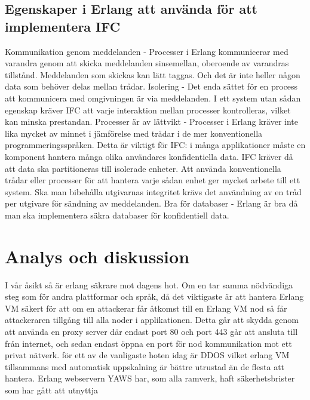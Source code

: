 \documentclass[12pt]{article}
\begin{document}
\subsection*{Egenskaper i Erlang att använda för att implementera IFC} 
Kommunikation genom meddelanden - Processer i Erlang kommunicerar med varandra genom att skicka meddelanden sinsemellan, oberoende av varandras tillstånd. Meddelanden som skickas kan lätt taggas. Och det är inte heller någon data som behöver delas mellan trådar. 
Isolering - Det enda sättet för en process att kommunicera med omgivningen är via meddelanden. I ett system utan sådan egenskap kräver IFC att varje interaktion mellan processer kontrolleras, vilket kan minska prestandan. 
Processer är av lättvikt - Processer i Erlang kräver inte lika mycket av minnet i jämförelse med trådar i de mer konventionella programmeringsspråken. Detta är viktigt för IFC: i många applikationer måste en komponent hantera många olika användares konfidentiella data. IFC kräver då att data ska partitioneras till isolerade enheter. Att använda konventionella trådar eller processer för att hantera varje sådan enhet ger mycket arbete till ett system. Ska man bibehålla utgivarnas integritet krävs det användning av en tråd per utgivare för sändning av meddelanden. \cite{IFC}
Bra för databaser - Erlang är bra då man ska implementera säkra databaser för konfidentiell data. \cite{database}




	


\section{	Analys och diskussion}


I vår åsikt så är erlang säkrare mot dagens hot. Om en tar samma nödvändiga steg som för andra plattformar och språk, då det viktigaste är att hantera Erlang VM säkert för att om en attackerar får åtkomst till en Erlang VM nod så får attackeraren tillgång till alla noder i applikationen. Detta går att skydda genom att använda en proxy \cite{101} server där endast port 80 och port 443 går att ansluta till från internet, och sedan endast öppna en port för nod kommunikation mot ett privat nätverk. för ett av de vanligaste hoten idag är DDOS vilket erlang VM tillsammans med automatisk uppskalning är bättre utrustad än de flesta att hantera.
Erlang webservern YAWS har, som alla ramverk, haft säkerhetsbrister som har gått att utnyttja \cite{exploit} 
	
\end{document}
